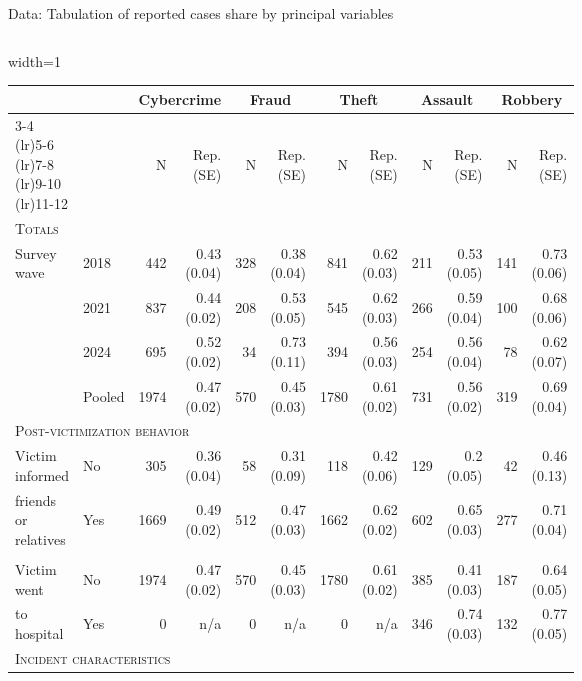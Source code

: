 \documentclass{beamer}
\begin{document}
	\begin{frame}{Data: Tabulation of reported cases share by principal variables}
		\begin{columns}
			\column{\dimexpr\paperwidth-10pt}
			\begin{adjustbox}{width=1\textwidth}
				\begin{tabular}{llrrrrrrrrrr}
					\toprule
					&  & \multicolumn{2}{c}{Cybercrime    } & \multicolumn{2}{c}{Fraud    } & \multicolumn{2}{c}{Theft    } & \multicolumn{2}{c}{Assault    } & \multicolumn{2}{c}{Robbery} \\ 
					\cmidrule(lr){3-4} \cmidrule(lr){5-6} \cmidrule(lr){7-8} \cmidrule(lr){9-10} \cmidrule(lr){11-12}
					&     & N & Rep. (SE) & N  & Rep. (SE)  & N   & Rep. (SE)   & N    & Rep. (SE)    & N     & Rep. (SE)     \\ 
					\multicolumn{12}{l}{\textsc{Totals}} \\
					Survey wave & 2018 & 442 & 0.43 (0.04) & 328 & 0.38 (0.04) & 841 & 0.62 (0.03) & 211 & 0.53 (0.05) & 141 & 0.73 (0.06) \\ 
					& 2021 & 837 & 0.44 (0.02) & 208 & 0.53 (0.05) & 545 & 0.62 (0.03) & 266 & 0.59 (0.04) & 100 & 0.68 (0.06) \\ 
					& 2024 & 695 & 0.52 (0.02) & 34 & 0.73 (0.11) & 394 & 0.56 (0.03) & 254 & 0.56 (0.04) & 78 & 0.62 (0.07) \\ 
					& Pooled & 1974 & 0.47 (0.02) & 570 & 0.45 (0.03) & 1780 & 0.61 (0.02) & 731 & 0.56 (0.02) & 319 & 0.69 (0.04) \\ 
					\midrule
					\multicolumn{12}{l}{\textsc{Post-victimization behavior}} \\
					Victim informed %
					& No & 305 & 0.36 (0.04) & 58 & 0.31 (0.09) & 118 & 0.42 (0.06) & 129 & 0.2 (0.05) & 42 & 0.46 (0.13) \\ 
					friends or relatives  & Yes & 1669 & 0.49 (0.02) & 512 & 0.47 (0.03) & 1662 & 0.62 (0.02) & 602 & 0.65 (0.03) & 277 & 0.71 (0.04) \\ 
					\vspace{1pt}\\
					Victim went & No & 1974 & 0.47 (0.02) & 570 & 0.45 (0.03) & 1780 & 0.61 (0.02) & 385 & 0.41 (0.03) & 187 & 0.64 (0.05) \\ 
					to hospital & Yes & 0 & n/a & 0 & n/a & 0 & n/a & 346 & 0.74 (0.03) & 132 & 0.77 (0.05) \\ 
					\midrule
							\multicolumn{12}{l}{\textsc{Incident characteristics}} \\

\end{tabular}
\end{adjustbox}
\end{columns}
\end{frame}
\end{document}
